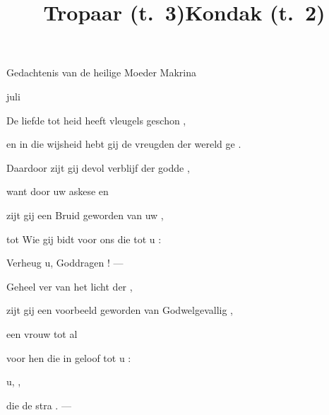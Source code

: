 
\centerline{\headfont Gedachtenis van de heilige Moeder Makrina}
\centerline{ juli}
\vskip8pt

\title{Tropaar (t.~3)}
\falltwo{---} De liefde tot  heid heeft vleugels geschon   ,\par
en in die wijsheid hebt gij de vreugden der wereld ge\- .\par
Daardoor zijt gij  devol verblijf der godde ,\par
want door uw askese en \par
zijt gij een Bruid geworden van uw \fall{\hold{-~~}},\par
tot Wie gij bidt voor ons die tot u :\par
\finalskip
Verheug u, Goddragen \rise{\hold{~~~}}! --- 

\title{Kondak (t.~2)}
\rise{---} Geheel ver van het licht der ,\par
zijt gij een voorbeeld geworden van Godwelgevallig ,\par
{} een vrouw tot al \fall{\hold{-~~}}\par
voor hen die in geloof tot u :\par
{} u, \fall{\hold{-~~}},\par
\finalskip
die de stra    . ---

\bye
